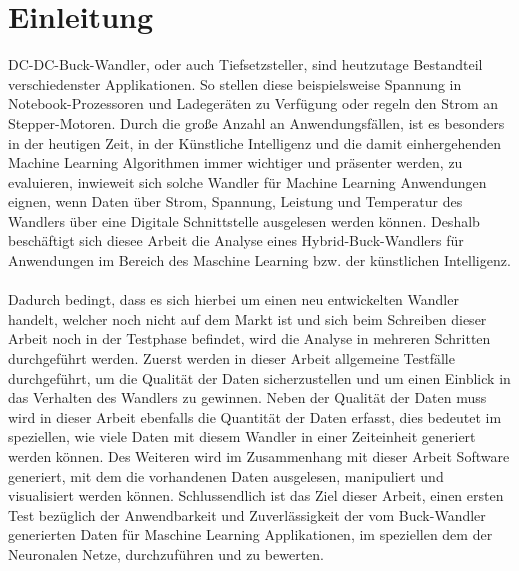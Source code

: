\section{Einleitung}

DC-DC-Buck-Wandler, oder auch Tiefsetzsteller, sind heutzutage Bestandteil verschiedenster Applikationen. So stellen diese beispielsweise Spannung in Notebook-Prozessoren und Ladegeräten zu Verfügung oder regeln den Strom an Stepper-Motoren. Durch die große Anzahl an Anwendungsfällen, ist es besonders in der heutigen Zeit, in der Künstliche Intelligenz und die damit einhergehenden Machine Learning Algorithmen immer wichtiger und präsenter werden, zu evaluieren, inwieweit sich solche Wandler für Machine Learning Anwendungen eignen, wenn Daten über Strom, Spannung, Leistung und Temperatur des Wandlers über eine Digitale Schnittstelle ausgelesen werden können. Deshalb beschäftigt sich diesee Arbeit die Analyse eines Hybrid-Buck-Wandlers für Anwendungen im Bereich des Maschine Learning bzw. der künstlichen Intelligenz.
\\
\\Dadurch bedingt, dass es sich hierbei um einen neu entwickelten Wandler handelt, welcher noch nicht auf dem Markt ist und sich beim Schreiben dieser Arbeit noch in der Testphase befindet, wird die Analyse in mehreren Schritten durchgeführt werden. Zuerst werden in dieser Arbeit allgemeine Testfälle durchgeführt, um die Qualität der Daten sicherzustellen und um einen Einblick in das Verhalten des Wandlers zu gewinnen. Neben der Qualität der Daten muss wird in dieser Arbeit ebenfalls die Quantität der Daten erfasst, dies bedeutet im speziellen, wie viele Daten mit diesem Wandler in einer Zeiteinheit generiert werden können. Des Weiteren wird im Zusammenhang mit dieser Arbeit Software generiert, mit dem die vorhandenen Daten ausgelesen, manipuliert und visualisiert werden können. Schlussendlich ist das Ziel dieser Arbeit, einen ersten Test bezüglich der Anwendbarkeit und Zuverlässigkeit der vom Buck-Wandler generierten Daten für Maschine Learning Applikationen, im speziellen dem der Neuronalen Netze, durchzuführen und zu bewerten.


